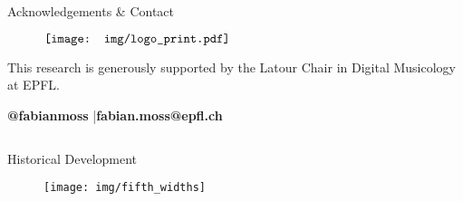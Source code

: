 \documentclass[final]{beamer}
\begin{document}
\begin{frame}[t]
\begin{minipage}[t][.65\textheight][t]{\textwidth}
\begin{columns}[t]
\begin{column}{0.3\textwidth}
			\begin{block}{Acknowledgements \& Contact}

        \begin{wrapfigure}{l}{.6\textwidth}
					$\vcenter{\hbox{\texttt{[image: img/logo\_print.pdf]}}}$
        \end{wrapfigure}

        \small
        This research is generously supported by the Latour Chair in Digital Musicology at EPFL.
				\normalsize
				\begin{center}
					\;\textbf{@fabianmoss} \enspace|\enspace {}\;\textbf{fabian.moss@epfl.ch}
				\end{center}
      \end{block}

    \end{column}
  \end{columns}

\end{minipage}

\begin{minipage}[t][.3\textheight][t]{\textwidth}

	\begin{columns}
		\begin{column}{.6\textwidth}
		  \begin{block}{Historical Development}

		    \begin{figure}[H]
		      \centering
					\texttt{[image: img/fifth\_widths]}
		    \end{figure}

		  \end{block}
		\end{column}

		\begin{column}{.3\textwidth}

		\end{column}

\end{columns}
\end{minipage}

\end{frame} %
\end{document}
